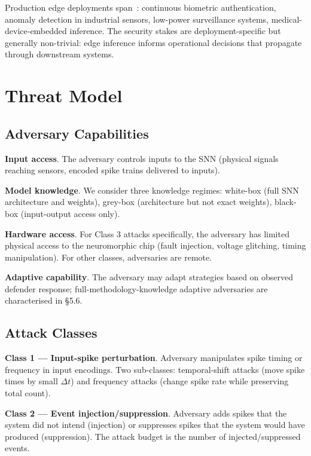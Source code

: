 \documentclass[sigconf,nonacm]{acmart}
\begin{document}
Production edge deployments span~\cite{rashid2024edgesec,
li2024edgemlsurv}: continuous biometric authentication, anomaly
detection in industrial sensors, low-power surveillance systems,
medical-device-embedded inference. The security stakes are
deployment-specific but generally non-trivial: edge inference
informs operational decisions that propagate through downstream
systems.

\section{Threat Model}

\subsection{Adversary Capabilities}

\textbf{Input access}. The adversary controls inputs to the SNN
(physical signals reaching sensors, encoded spike trains
delivered to inputs).

\textbf{Model knowledge}. We consider three knowledge regimes:
white-box (full SNN architecture and weights), grey-box
(architecture but not exact weights), black-box (input-output
access only).

\textbf{Hardware access}. For Class 3 attacks specifically, the
adversary has limited physical access to the neuromorphic chip
(fault injection, voltage glitching, timing manipulation). For
other classes, adversaries are remote.

\textbf{Adaptive capability}. The adversary may adapt strategies
based on observed defender response; full-methodology-knowledge
adaptive adversaries are characterised in §5.6.

\subsection{Attack Classes}

\textbf{Class 1 --- Input-spike perturbation}. Adversary
manipulates spike timing or frequency in input encodings. Two
sub-classes: temporal-shift attacks (move spike times by small
$\Delta t$) and frequency attacks (change spike rate while
preserving total count).

\textbf{Class 2 --- Event injection/suppression}. Adversary adds
spikes that the system did not intend (injection) or suppresses
spikes that the system would have produced (suppression). The
attack budget is the number of injected/suppressed events.
\end{document}

